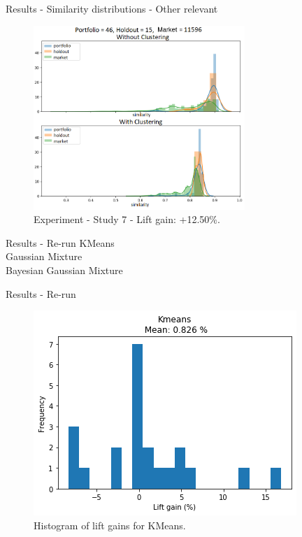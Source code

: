 
\begin{frame}{Results - Similarity distributions - Other relevant}
    \begin{figure}
       \centering
       \includegraphics[width=8cm]{fig/ch4-worth-mentioning-study-7.png}
       \caption{Experiment \nameExperimentII{} - Study 7 - Lift gain: \colorbox{dgreen}{+12.50\%.}}
    \end{figure}
\end{frame}


\begin{frame}{Results - Re-run \fullNameExperimentII{}} \pause
    KMeans \\
    \vspace{0.5cm}
    Gaussian Mixture \\
    \vspace{0.5cm}
    Bayesian Gaussian Mixture
\end{frame}


\begin{frame}{Results - Re-run \fullNameExperimentII{}}
    \begin{figure}
        \centering
        \includegraphics[width=.75\linewidth]{fig/ch4-kmeans_lift_gain_hist.png}
        \caption{Histogram of lift gains for KMeans.}
    \end{figure}
\end{frame}


